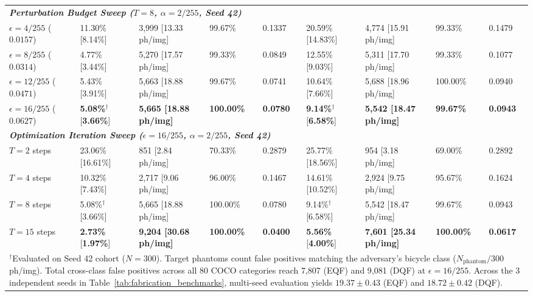 \documentclass[preprint,12pt]{elsarticle}
\begin{document}
\begin{table}[!htbp]
{\begin{tabular}{l l l l l l l l l}
\midrule
\multicolumn{9}{l}{\textit{\textbf{Perturbation Budget Sweep ($T=8$, $\alpha = 2/255$, Seed 42)}}} \\
$\epsilon = 4/255$ ($0.0157$) & 11.30\% [8.14\%] & 3,999 [13.33 ph/img] & 99.67\% & 0.1337 & 20.59\% [14.83\%] & 4,774 [15.91 ph/img] & 99.33\% & 0.1479 \\
$\epsilon = 8/255$ ($0.0314$) & 4.77\% [3.44\%] & 5,270 [17.57 ph/img] & 99.33\% & 0.0849 & 12.55\% [9.03\%] & 5,311 [17.70 ph/img] & 99.33\% & 0.1077 \\
$\epsilon = 12/255$ ($0.0471$) & 5.43\% [3.91\%] & 5,663 [18.88 ph/img] & 99.67\% & 0.0741 & 10.64\% [7.66\%] & 5,688 [18.96 ph/img] & 100.00\% & 0.0940 \\
$\epsilon = 16/255$ ($0.0627$) & \textbf{5.08\%}$^\dagger$ [\textbf{3.66\%}] & \textbf{5,665 [18.88 ph/img]} & \textbf{100.00\%} & \textbf{0.0780} & \textbf{9.14\%}$^\dagger$ [\textbf{6.58\%}] & \textbf{5,542 [18.47 ph/img]} & \textbf{99.67\%} & \textbf{0.0943} \\
\midrule
\multicolumn{9}{l}{\textit{\textbf{Optimization Iteration Sweep ($\epsilon = 16/255$, $\alpha = 2/255$, Seed 42)}}} \\
$T = 2$ steps & 23.06\% [16.61\%] & 851 [2.84 ph/img] & 70.33\% & 0.2879 & 25.77\% [18.56\%] & 954 [3.18 ph/img] & 69.00\% & 0.2892 \\
$T = 4$ steps & 10.32\% [7.43\%] & 2,717 [9.06 ph/img] & 96.00\% & 0.1467 & 14.61\% [10.52\%] & 2,924 [9.75 ph/img] & 95.67\% & 0.1624 \\
$T = 8$ steps & 5.08\%$^\dagger$ [3.66\%] & 5,665 [18.88 ph/img] & 100.00\% & 0.0780 & 9.14\%$^\dagger$ [6.58\%] & 5,542 [18.47 ph/img] & 99.67\% & 0.0943 \\
$T = 15$ steps & \textbf{2.73\%} [\textbf{1.97\%}] & \textbf{9,204 [30.68 ph/img]} & \textbf{100.00\%} & \textbf{0.0400} & \textbf{5.56\%} [\textbf{4.00\%}] & \textbf{7,601 [25.34 ph/img]} & \textbf{100.00\%} & \textbf{0.0617} \\
\bottomrule
\multicolumn{9}{l}{\footnotesize{$^\dagger$Evaluated on Seed 42 cohort ($N=300$). Target phantoms count false positives matching the adversary's bicycle class ($N_{\mathrm{phantom}}/300$ ph/img). Total cross-class false positives across all 80 COCO categories reach 7,807 (EQF) and 9,081 (DQF) at $\epsilon=16/255$. Across the 3 independent seeds in Table~\ref{tab:fabrication_benchmarks}, multi-seed evaluation yields $19.37 \pm 0.43$ (EQF) and $18.72 \pm 0.42$ (DQF).}}
\end{tabular}%
}
\end{table}
\end{document}
